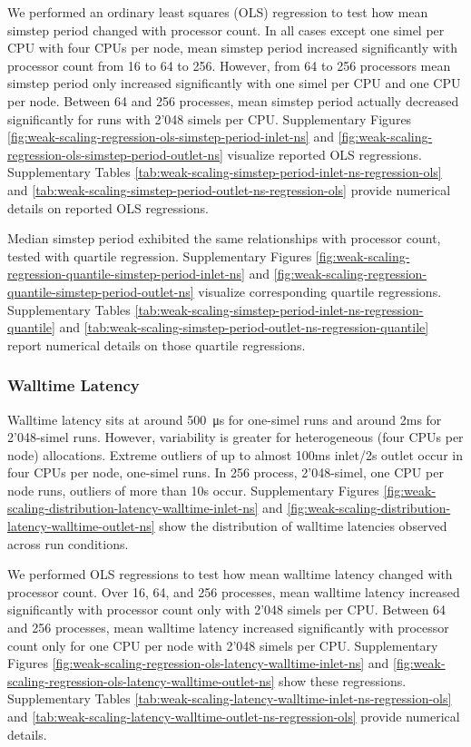 We performed an ordinary least squares (OLS) regression to test how mean simstep period changed with processor count.
In all cases except one simel per CPU with four CPUs per node, mean simstep period increased significantly with processor count from 16 to 64 to 256.
However, from 64 to 256 processors mean simstep period only increased significantly with one simel per CPU and one CPU per node.
Between 64 and 256 processes, mean simstep period actually decreased significantly for runs with 2'048 simels per CPU.
Supplementary Figures \ref{fig:weak-scaling-regression-ols-simstep-period-inlet-ns} and \ref{fig:weak-scaling-regression-ols-simstep-period-outlet-ns} visualize reported OLS regressions.
Supplementary Tables \ref{tab:weak-scaling-simstep-period-inlet-ns-regression-ols} and \ref{tab:weak-scaling-simstep-period-outlet-ns-regression-ols} provide numerical details on reported OLS regressions.

Median simstep period exhibited the same relationships with processor count, tested with quartile regression.
Supplementary Figures \ref{fig:weak-scaling-regression-quantile-simstep-period-inlet-ns} and \ref{fig:weak-scaling-regression-quantile-simstep-period-outlet-ns} visualize corresponding quartile regressions.
Supplementary Tables \ref{tab:weak-scaling-simstep-period-inlet-ns-regression-quantile} and \ref{tab:weak-scaling-simstep-period-outlet-ns-regression-quantile} report numerical details on those quartile regressions.

\subsubsection{Walltime Latency}

Walltime latency sits at around \SI{500}{\micro\second} for one-simel runs and around 2ms for 2'048-simel runs.
However, variability is greater for heterogeneous (four CPUs per node) allocations.
Extreme outliers of up to almost 100ms inlet/2s outlet occur in four CPUs per node, one-simel runs.
In 256 process, 2'048-simel, one CPU per node runs, outliers of more than 10s occur.
Supplementary Figures \ref{fig:weak-scaling-distribution-latency-walltime-inlet-ns} and \ref{fig:weak-scaling-distribution-latency-walltime-outlet-ns} show the distribution of walltime latencies observed across run conditions.

We performed OLS regressions to test how mean walltime latency changed with processor count.
Over 16, 64, and 256 processes, mean walltime latency increased significantly with processor count only with 2'048 simels per CPU.
Between 64 and 256 processes, mean walltime latency increased significantly with processor count only for one CPU per node with 2'048 simels per CPU.
Supplementary Figures \ref{fig:weak-scaling-regression-ols-latency-walltime-inlet-ns} and \ref{fig:weak-scaling-regression-ols-latency-walltime-outlet-ns} show these regressions.
Supplementary Tables \ref{tab:weak-scaling-latency-walltime-inlet-ns-regression-ols} and \ref{tab:weak-scaling-latency-walltime-outlet-ns-regression-ols} provide numerical details.

